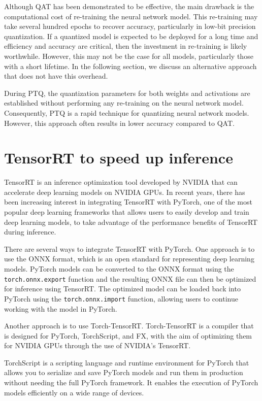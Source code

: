 Although QAT has been demonstrated to be effective, the main drawback is the computational cost of re-training the neural network model. This re-training may take several hundred epochs to recover accuracy, particularly in low-bit precision quantization. If a quantized model is expected to be deployed for a long time and efficiency and accuracy are critical, then the investment in re-training is likely worthwhile. However, this may not be the case for all models, particularly those with a short lifetime. In the following section, we discuss an alternative approach that does not have this overhead.

During PTQ, the quantization parameters for both weights and activations are established without performing any re-training on the neural network model. Consequently, PTQ is a rapid technique for quantizing neural network models. However, this approach often results in lower accuracy compared to QAT.

\section{TensorRT to speed up inference}
\label{sec:tensorrt}

TensorRT is an inference optimization tool developed by NVIDIA that can accelerate deep learning models on NVIDIA GPUs. In recent years, there has been increasing interest in integrating TensorRT with PyTorch, one of the most popular deep learning frameworks that allows users to easily develop and train deep learning models, to take advantage of the performance benefits of TensorRT during inference.
 
There are several ways to integrate TensorRT with PyTorch. One approach is to use the ONNX format, which is an open standard for representing deep learning models. PyTorch models can be converted to the ONNX format using the \texttt{torch.onnx.export} function and the resulting ONNX file can then be optimized for inference using TensorRT. The optimized model can be loaded back into PyTorch using the \texttt{torch.onnx.import} function, allowing users to continue working with the model in PyTorch.

Another approach is to use Torch-TensorRT. Torch-TensorRT is a compiler that is designed for PyTorch, TorchScript, and FX, with the aim of optimizing them for NVIDIA GPUs through the use of NVIDIA's TensorRT.

TorchScript is a scripting language and runtime environment for PyTorch that allows you to serialize and save PyTorch models and run them in production without needing the full PyTorch framework. It enables the execution of PyTorch models efficiently on a wide range of devices.

